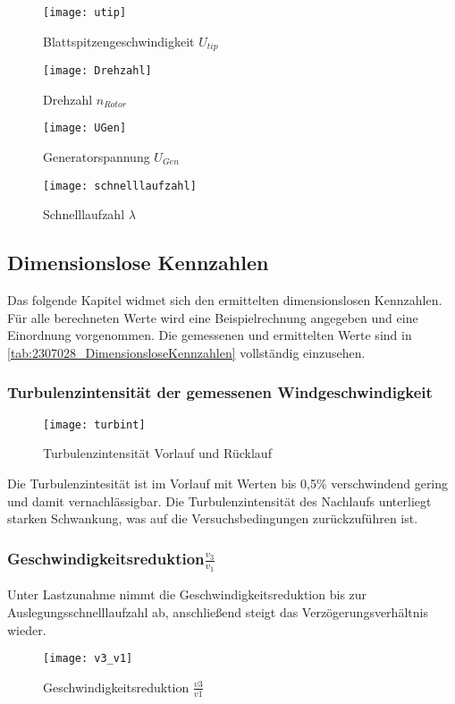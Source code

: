 \begin{figure}[H]
    \centering
        \begin{minipage}[t]{0.4\textwidth}
            \texttt{[image: utip]}
            \caption{Blattspitzengeschwindigkeit $U_{tip}$}
            \label{fig:utip}
        \end{minipage}
        \begin{minipage}[t]{0.4\textwidth}
            \texttt{[image: Drehzahl]}
            \caption{Drehzahl $n_{Rotor}$}
            \label{fig:n_rotor}
        \end{minipage}
        \begin{minipage}[b]{0.4\textwidth}
            \texttt{[image: UGen]}
            \caption{Generatorspannung $U_{Gen}$}
            \label{fig:UGen}
        \end{minipage}
        \begin{minipage}[b]{0.4\textwidth}
            \texttt{[image: schnelllaufzahl]}
            \caption{Schnelllaufzahl $\lambda$}
            \label{fig:lambda}
        \end{minipage}
    \end{figure}  

\subsection{Dimensionslose Kennzahlen}
Das folgende Kapitel widmet sich den ermittelten dimensionslosen Kennzahlen.
Für alle berechneten Werte wird eine Beispielrechnung angegeben und eine Einordnung vorgenommen.
Die gemessenen und ermittelten Werte sind in \autoref{tab:2307028_DimensionsloseKennzahlen} vollständig einzusehen.
\subsubsection*{Turbulenzintensität der gemessenen Windgeschwindigkeit}
\begin{figure}[H]
    \centering
    \texttt{[image: turbint]}
    \caption{Turbulenzintensität Vorlauf und Rücklauf}
    \label{fig:Turbulenzintensität}
\end{figure}
Die Turbulenzintesität ist im Vorlauf mit Werten bis 0,5\% verschwindend gering und damit vernachlässigbar. Die Turbulenzintensität des Nachlaufs unterliegt starken Schwankung, was auf die Versuchsbedingungen zurückzuführen ist.

\subsubsection*{Geschwindigkeitsreduktion$\frac{v_3}{v_1}$}
Unter Lastzunahme nimmt die Geschwindigkeitsreduktion bis zur Auslegungsschnelllaufzahl ab, anschließend steigt das Verzögerungsverhältnis wieder. 
\begin{figure}[H]
    \centering
    \texttt{[image: v3\_v1]}
    \caption{Geschwindigkeitsreduktion $\frac{v3}{v1}$}
    \label{fig:Geschwindigkeitsreduktion}
\end{figure}

